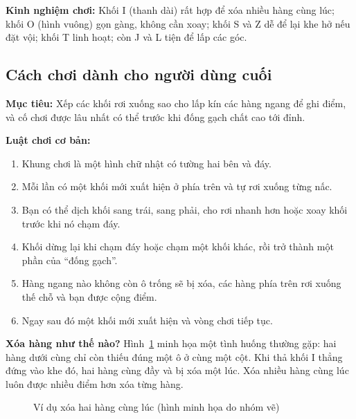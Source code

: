 \documentclass[a4paper]{article}
\newcommand{\tetro}[3]{\foreach \x/\y in {#1}{%
  \fill[#2,draw=black!55,line width=0.3pt] (\x*#3,\y*#3) rectangle ++(#3,#3);}}
\begin{document}
\textbf{Kinh nghiệm chơi:} Khối I (thanh dài) rất hợp để xóa nhiều hàng cùng lúc; khối O (hình vuông) gọn gàng, không cần xoay; khối S và Z dễ để lại khe hở nếu đặt vội; khối T linh hoạt; còn J và L tiện để lấp các góc.

\subsection{Cách chơi dành cho người dùng cuối}
\textbf{Mục tiêu:} Xếp các khối rơi xuống sao cho lấp kín các hàng ngang để ghi điểm, và cố chơi được lâu nhất có thể trước khi đống gạch chất cao tới đỉnh.

\textbf{Luật chơi cơ bản:}
\begin{enumerate}
  \item Khung chơi là một hình chữ nhật có tường hai bên và đáy.
  \item Mỗi lần có một khối mới xuất hiện ở phía trên và tự rơi xuống từng nấc.
  \item Bạn có thể dịch khối sang trái, sang phải, cho rơi nhanh hơn hoặc xoay khối trước khi nó chạm đáy.
  \item Khối dừng lại khi chạm đáy hoặc chạm một khối khác, rồi trở thành một phần của ``đống gạch''.
  \item Hàng ngang nào không còn ô trống sẽ bị xóa, các hàng phía trên rơi xuống thế chỗ và bạn được cộng điểm.
  \item Ngay sau đó một khối mới xuất hiện và vòng chơi tiếp tục.
\end{enumerate}

\textbf{Xóa hàng như thế nào?} Hình~\ref{fig:xoahang} minh họa một tình huống thường gặp: hai hàng dưới cùng chỉ còn thiếu đúng một ô ở cùng một cột. Khi thả khối I thẳng đứng vào khe đó, hai hàng cùng đầy và bị xóa một lúc. Xóa nhiều hàng cùng lúc luôn được nhiều điểm hơn xóa từng hàng.

\begin{figure}[H]
\centering
{}
\caption{Ví dụ xóa hai hàng cùng lúc (hình minh họa do nhóm vẽ)}
\label{fig:xoahang}
\end{figure}
\end{document}
